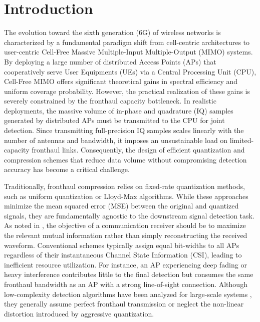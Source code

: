 \section{Introduction}

The evolution toward the sixth generation (6G) of wireless networks is characterized by a fundamental paradigm shift from cell-centric architectures to user-centric Cell-Free Massive Multiple-Input Multiple-Output (MIMO) systems. By deploying a large number of distributed Access Points (APs) that cooperatively serve User Equipments (UEs) via a Central Processing Unit (CPU), Cell-Free MIMO offers significant theoretical gains in spectral efficiency and uniform coverage probability. However, the practical realization of these gains is severely constrained by the fronthaul capacity bottleneck. In realistic deployments, the massive volume of in-phase and quadrature (IQ) samples generated by distributed APs must be transmitted to the CPU for joint detection. Since transmitting full-precision IQ samples scales linearly with the number of antennas and bandwidth, it imposes an unsustainable load on limited-capacity fronthaul links. Consequently, the design of efficient quantization and compression schemes that reduce data volume without compromising detection accuracy has become a critical challenge.

Traditionally, fronthaul compression relies on fixed-rate quantization methods, such as uniform quantization or Lloyd-Max algorithms. While these approaches minimize the mean squared error (MSE) between the original and quantized signals, they are fundamentally agnostic to the downstream signal detection task. As noted in \cite{Lewandowsky2021GeneticAT}, the objective of a communication receiver should be to maximize the relevant mutual information rather than simply reconstructing the received waveform. Conventional schemes typically assign equal bit-widths to all APs regardless of their instantaneous Channel State Information (CSI), leading to inefficient resource utilization. For instance, an AP experiencing deep fading or heavy interference contributes little to the final detection but consumes the same fronthaul bandwidth as an AP with a strong line-of-sight connection. Although low-complexity detection algorithms have been analyzed for large-scale systems \cite{Jeon2015OptimalityOL, Som2010ImprovedLD}, they generally assume perfect fronthaul transmission or neglect the non-linear distortion introduced by aggressive quantization.

